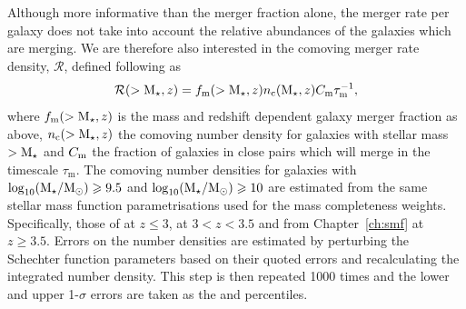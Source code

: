 Although more informative than the merger fraction alone, the merger rate per galaxy does not take into account the relative abundances of the galaxies which are merging. We are therefore also interested in the comoving merger rate density, $\mathcal{R}$, defined following \citet{Lin:2004ki} as
\begin{equation}\label{eq:merger_rate}
	\mathcal{R}(>\text{M}_{\star}, z) = f_{\text{m}}(>\text{M}_{\star}, z)n_{\text{c}}(\text{M}_{\star}, z) C_{\rm{m}}\tau_{\text{m}}^{-1},
\end{equation}
where $f_{\text{m}}(>\text{M}_{\star}, z)$ is the mass and redshift dependent galaxy merger fraction as above, $n_{\text{c}}(>\text{M}_{\star}, z)$ the comoving number density for galaxies with stellar mass $>\text{M}_{\star}$ and $C_{\rm{m}}$ the fraction of galaxies in close pairs which will merge in the timescale $\tau_{\text{m}}$. The comoving number densities for galaxies with $\log_{10}(\text{M}_{\star} / \text{M}_{\odot}) \geqslant 9.5$ and $\log_{10}(\text{M}_{\star} / \text{M}_{\odot}) \geqslant 10$ are estimated from the same stellar mass function parametrisations used for the mass completeness weights. Specifically, those of \citet{Mortlock:2014et} at $z \leq 3$, \citet{Santini:2012jq} at $3 < z < 3.5$ and from Chapter~\ref{ch:smf} at $z \geq 3.5$. Errors on the number densities are estimated by perturbing the Schechter function parameters based on their quoted errors and recalculating the integrated number density. This step is then repeated 1000 times and the lower and upper 1-$\sigma$ errors are taken as the  and  percentiles.

